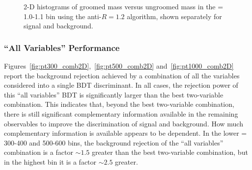 \begin{figure}
\centering
{}
\caption{2-D histograms of groomed mass versus ungroomed mass in the \pt = 1.0-1.1 \TeV bin using the
  anti-\kT $R=1.2$ algorithm, shown separately for signal and background.}
\label{fig:pt1000_2d_masses_AKt_R12}
\end{figure}

\subsubsection{``All Variables'' Performance}\label{sec:Wtagallvars}

Figures~\ref{fig:pt300_comb2D},~\ref{fig:pt500_comb2D}
and~\ref{fig:pt1000_comb2D}  report the background rejection
achieved by a combination of all the variables considered into a
single BDT discriminant. In all cases, the rejection
power of this ``all variables'' BDT is significantly larger than the
best two-variable combination. This indicates
that, beyond the best two-variable combination, there is still
significant complementary information available in the remaining
observables  to improve the discrimination of signal and
background. How much complementary information is available appears to
be \pt dependent. In the lower \pt = 300-400 and 500-600 \GeV bins, the
background rejection of the ``all variables'' combination is a factor
$\sim 1.5$ greater than the best two-variable combination, but in the
highest \pt bin it is a factor $\sim 2.5$ greater. 

